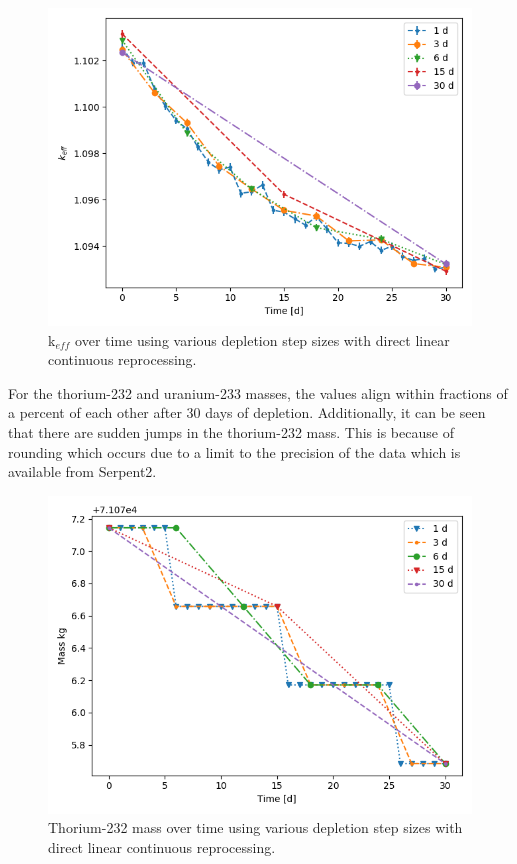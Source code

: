 \begin{figure}[H]
  \centering
  \includegraphics[scale=0.7]{images/DL_NSTEP_keff.png}
  \caption{k$_{eff}$ over time using various depletion step sizes with direct linear continuous reprocessing.}
   \label{fig:DL-cont-k}
\end{figure}

For the thorium-232 and uranium-233 masses, the values align within fractions of a percent of each other after 30 days of depletion. Additionally, it can be seen that there are sudden jumps in the thorium-232 mass. This is because of rounding which occurs due to a limit to the precision of the data which is available from Serpent2.

\begin{figure}[H]
  \centering
  \includegraphics[scale=0.7]{images/DL_NSTEP_Th-232_mass.png}
  \caption{Thorium-232 mass over time using various depletion step sizes with direct linear continuous reprocessing.}
   \label{fig:DL-cont-th}
\end{figure}

